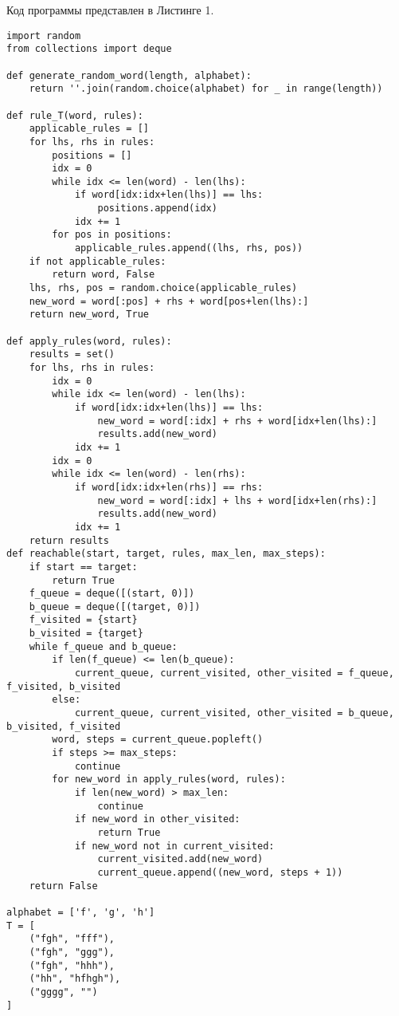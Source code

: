 \documentclass[a4paper, 14pt]{extarticle}
\begin{document}
Код программы представлен в Листинге 1.
\begin{lstlisting}
import random
from collections import deque

def generate_random_word(length, alphabet):
    return ''.join(random.choice(alphabet) for _ in range(length))

def rule_T(word, rules):
    applicable_rules = []
    for lhs, rhs in rules:
        positions = []
        idx = 0
        while idx <= len(word) - len(lhs):
            if word[idx:idx+len(lhs)] == lhs:
                positions.append(idx)
            idx += 1
        for pos in positions:
            applicable_rules.append((lhs, rhs, pos))
    if not applicable_rules:
        return word, False
    lhs, rhs, pos = random.choice(applicable_rules)
    new_word = word[:pos] + rhs + word[pos+len(lhs):]
    return new_word, True

def apply_rules(word, rules):
    results = set()
    for lhs, rhs in rules:
        idx = 0
        while idx <= len(word) - len(lhs):
            if word[idx:idx+len(lhs)] == lhs:
                new_word = word[:idx] + rhs + word[idx+len(lhs):]
                results.add(new_word)
            idx += 1
        idx = 0
        while idx <= len(word) - len(rhs):
            if word[idx:idx+len(rhs)] == rhs:
                new_word = word[:idx] + lhs + word[idx+len(rhs):]
                results.add(new_word)
            idx += 1
    return results
def reachable(start, target, rules, max_len, max_steps):
    if start == target:
        return True
    f_queue = deque([(start, 0)])
    b_queue = deque([(target, 0)])
    f_visited = {start}
    b_visited = {target}
    while f_queue and b_queue:
        if len(f_queue) <= len(b_queue):
            current_queue, current_visited, other_visited = f_queue, f_visited, b_visited
        else:
            current_queue, current_visited, other_visited = b_queue, b_visited, f_visited
        word, steps = current_queue.popleft()
        if steps >= max_steps:
            continue
        for new_word in apply_rules(word, rules):
            if len(new_word) > max_len:
                continue
            if new_word in other_visited:
                return True
            if new_word not in current_visited:
                current_visited.add(new_word)
                current_queue.append((new_word, steps + 1))
    return False

alphabet = ['f', 'g', 'h']
T = [
    ("fgh", "fff"),
    ("fgh", "ggg"),
    ("fgh", "hhh"),
    ("hh", "hfhgh"),
    ("gggg", "")
]


\end{lstlisting}
\end{document}
